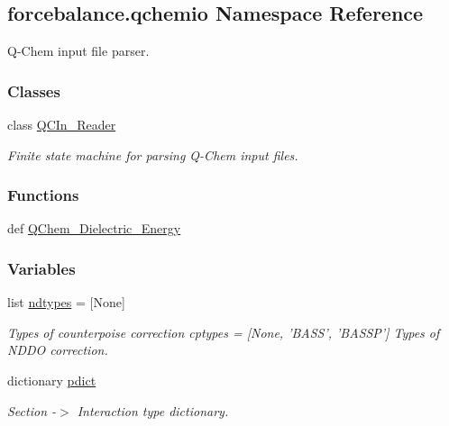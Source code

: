 \hypertarget{namespaceforcebalance_1_1qchemio}{\subsection{forcebalance.\-qchemio Namespace Reference}
\label{namespaceforcebalance_1_1qchemio}
}


Q-\/\-Chem input file parser.  


\subsubsection*{Classes}
\begin{DoxyCompactItemize}
\item 
class \hyperlink{classforcebalance_1_1qchemio_1_1QCIn__Reader}{Q\-C\-In\-\_\-\-Reader}
\begin{DoxyCompactList}\small\item\em Finite state machine for parsing Q-\/\-Chem input files. \end{DoxyCompactList}\end{DoxyCompactItemize}
\subsubsection*{Functions}
\begin{DoxyCompactItemize}
\item 
def \hyperlink{namespaceforcebalance_1_1qchemio_a067c1b4f6695fc5dc20b5de66114bb7f}{Q\-Chem\-\_\-\-Dielectric\-\_\-\-Energy}
\end{DoxyCompactItemize}
\subsubsection*{Variables}
\begin{DoxyCompactItemize}
\item 
list \hyperlink{namespaceforcebalance_1_1qchemio_a5c04a6c864770abe6ba25d3e6a5a8119}{ndtypes} = \mbox{[}None\mbox{]}
\begin{DoxyCompactList}\small\item\em Types of counterpoise correction cptypes = \mbox{[}None, 'B\-A\-S\-S', 'B\-A\-S\-S\-P'\mbox{]} Types of N\-D\-D\-O correction. \end{DoxyCompactList}\item 
dictionary \hyperlink{namespaceforcebalance_1_1qchemio_ad9040be76e063b08b49a26ca12295a18}{pdict}
\begin{DoxyCompactList}\small\item\em Section -\/$>$ Interaction type dictionary. \end{DoxyCompactList}\end{DoxyCompactItemize}


